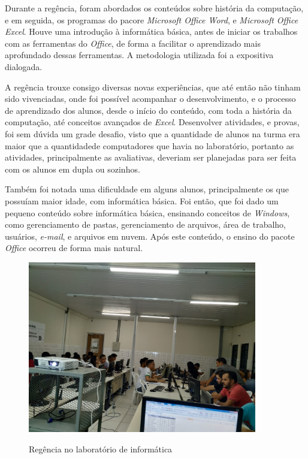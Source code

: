 \begin{OnehalfSpace}
    Durante a regência, foram abordados os conteúdos sobre história da computação, e em seguida, os programas do pacore \textit{Microsoft Office Word}, e \textit{Microsoft Office Excel}. Houve uma introdução à informática básica, antes de iniciar os trabalhos com as ferramentas do \textit{Office}, de forma a facilitar o aprendizado mais aprofundado dessas ferramentas. 
    A metodologia utilizada foi a expositiva dialogada.

    A regência trouxe consigo diversas novas experiências, que até então não tinham sido vivenciadas, onde foi possível acompanhar o desenvolvimento, e o processo de aprendizado dos alunos, desde o início do conteúdo, com toda a história da computação, até conceitos avançados de \textit{Excel}. 
    Desenvolver atividades, e provas, foi sem dúvida um grade desafio, visto que a quantidade de alunos na turma era maior que a quantidadede computadores que havia no laboratório, portanto as atividades, principalmente as avaliativas, deveriam ser planejadas para ser feita com os alunos em dupla ou sozinhos.

    Também foi notada uma dificuldade em alguns alunos, principalmente os que possuíam maior idade, com informática básica. Foi então, que foi dado um pequeno conteúdo sobre informática básica, ensinando conceitos de \textit{Windows}, como gerenciamento de pastas, gerenciamento de arquivos, área de trabalho, usuários, \textit{e-mail}, e arquivos em nuvem. Após este conteúdo, o ensino do pacote \textit{Office} ocorreu de forma mais natural.

    \begin{figure}[H]
        \centering
        \caption{Regência no laboratório de informática}
        \includegraphics[width=100mm]{img/reg1.jpg}
        \label{figura}
    \end{figure}


\end{OnehalfSpace}